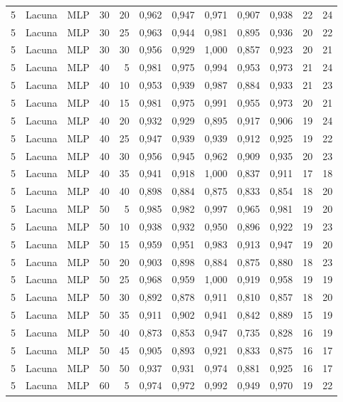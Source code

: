 \begin{longtable}{ccclrrrrrrrr}
5 & Lacuna & MLP & 30 & 20 & 0,962 & 0,947 & 0,971 & 0,907 & 0,938 & 22 & 24 \\
5 & Lacuna & MLP & 30 & 25 & 0,963 & 0,944 & 0,981 & 0,895 & 0,936 & 20 & 22 \\
5 & Lacuna & MLP & 30 & 30 & 0,956 & 0,929 & 1,000 & 0,857 & 0,923 & 20 & 21 \\
5 & Lacuna & MLP & 40 & 5 & 0,981 & 0,975 & 0,994 & 0,953 & 0,973 & 21 & 24 \\
5 & Lacuna & MLP & 40 & 10 & 0,953 & 0,939 & 0,987 & 0,884 & 0,933 & 21 & 23 \\
5 & Lacuna & MLP & 40 & 15 & 0,981 & 0,975 & 0,991 & 0,955 & 0,973 & 20 & 21 \\
5 & Lacuna & MLP & 40 & 20 & 0,932 & 0,929 & 0,895 & 0,917 & 0,906 & 19 & 24 \\
5 & Lacuna & MLP & 40 & 25 & 0,947 & 0,939 & 0,939 & 0,912 & 0,925 & 19 & 22 \\
5 & Lacuna & MLP & 40 & 30 & 0,956 & 0,945 & 0,962 & 0,909 & 0,935 & 20 & 23 \\
5 & Lacuna & MLP & 40 & 35 & 0,941 & 0,918 & 1,000 & 0,837 & 0,911 & 17 & 18 \\
5 & Lacuna & MLP & 40 & 40 & 0,898 & 0,884 & 0,875 & 0,833 & 0,854 & 18 & 20 \\
5 & Lacuna & MLP & 50 & 5 & 0,985 & 0,982 & 0,997 & 0,965 & 0,981 & 19 & 20 \\
5 & Lacuna & MLP & 50 & 10 & 0,938 & 0,932 & 0,950 & 0,896 & 0,922 & 19 & 23 \\
5 & Lacuna & MLP & 50 & 15 & 0,959 & 0,951 & 0,983 & 0,913 & 0,947 & 19 & 20 \\
5 & Lacuna & MLP & 50 & 20 & 0,903 & 0,898 & 0,884 & 0,875 & 0,880 & 18 & 23 \\
5 & Lacuna & MLP & 50 & 25 & 0,968 & 0,959 & 1,000 & 0,919 & 0,958 & 19 & 19 \\
5 & Lacuna & MLP & 50 & 30 & 0,892 & 0,878 & 0,911 & 0,810 & 0,857 & 18 & 20 \\
5 & Lacuna & MLP & 50 & 35 & 0,911 & 0,902 & 0,941 & 0,842 & 0,889 & 15 & 19 \\
5 & Lacuna & MLP & 50 & 40 & 0,873 & 0,853 & 0,947 & 0,735 & 0,828 & 16 & 19 \\
5 & Lacuna & MLP & 50 & 45 & 0,905 & 0,893 & 0,921 & 0,833 & 0,875 & 16 & 17 \\
5 & Lacuna & MLP & 50 & 50 & 0,937 & 0,931 & 0,974 & 0,881 & 0,925 & 16 & 17 \\
5 & Lacuna & MLP & 60 & 5 & 0,974 & 0,972 & 0,992 & 0,949 & 0,970 & 19 & 22 \\

\end{longtable}

